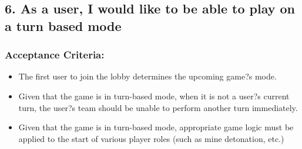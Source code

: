 \subsection*{6. As a user, I would like to be able to play on a turn based mode}


\subsubsection*{Acceptance Criteria:}

\begin{itemize}
\item The first user to join the lobby determines the upcoming game?s mode.
\item Given that the game is in turn-based mode, when it is not a user?s current turn, the user?s team should be unable to perform another turn immediately.
\item Given that the game is in turn-based mode, appropriate game logic must be applied to the start of various player roles (such as mine detonation, etc.)
\end{itemize}
